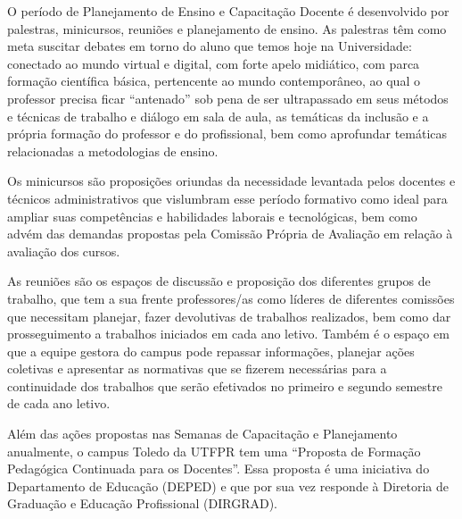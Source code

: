 O período de Planejamento de Ensino e Capacitação Docente é desenvolvido por palestras, minicursos, reuniões e planejamento de ensino. As palestras têm como meta suscitar debates em torno do aluno que temos hoje na Universidade: conectado ao mundo virtual e digital, com forte apelo midiático, com parca formação científica básica, pertencente ao mundo contemporâneo, ao qual o professor precisa ficar ``antenado'' sob pena de ser ultrapassado em seus métodos e técnicas de trabalho e diálogo em sala de aula, as temáticas da inclusão e a própria formação do professor e do profissional, bem como aprofundar temáticas relacionadas a metodologias de ensino.

Os minicursos são proposições oriundas da necessidade levantada pelos docentes e técnicos administrativos que vislumbram esse período formativo como ideal para ampliar suas competências e habilidades laborais e tecnológicas, bem como advém das demandas propostas pela Comissão Própria de Avaliação em relação à avaliação dos cursos.

As reuniões são os espaços de discussão e proposição dos diferentes grupos de trabalho, que tem a sua frente professores/as como líderes de diferentes comissões que necessitam planejar, fazer devolutivas de trabalhos realizados, bem como dar prosseguimento a trabalhos iniciados em cada ano letivo. Também é o espaço em que a equipe gestora do campus pode repassar informações, planejar ações coletivas e apresentar as normativas que se fizerem necessárias para a continuidade dos trabalhos que serão efetivados no primeiro e segundo semestre de cada ano letivo.

Além das ações propostas nas Semanas de Capacitação e Planejamento anualmente, o campus Toledo da UTFPR tem uma ``Proposta de Formação Pedagógica Continuada para os Docentes''. Essa proposta é uma iniciativa do Departamento de Educação (DEPED) e que por sua vez responde à Diretoria de Graduação e Educação Profissional (DIRGRAD).